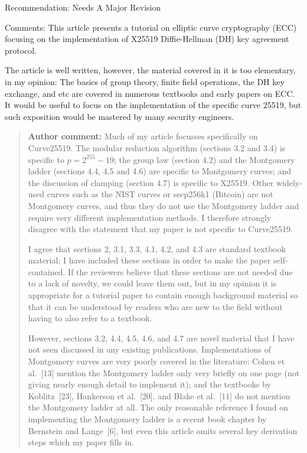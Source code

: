 \documentclass[10pt]{article}
\newcommand{\authorcomment}[1]{\begin{quote}\textbf{Author comment:} #1\end{quote}}
\begin{document}
\begin{spverbatim}
Recommendation: Needs A Major Revision

Comments:
This article presents a tutorial on elliptic curve cryptography (ECC) focusing on the implementation of X25519 Diffie-Hellman (DH) key agreement protocol. 

The article is well written, however, the material covered in it is too elementary, in my opinion: The basics of group theory, finite field operations, the DH key exchange, and etc are covered in numerous textbooks and early papers on ECC.  It would be useful to focus on the implementation of the specific curve 25519, but such exposition would be mastered by many security engineers. 
\end{spverbatim}
\authorcomment{Much of my article focusses specifically on Curve25519.
The modular reduction algorithm (sections 3.2 and 3.4) is specific to $p = 2^{255} - 19$; the group law (section 4.2) and the Montgomery ladder (sections 4.4, 4.5 and 4.6) are specific to Montgomery curves; and the discussion of clamping (section 4.7) is specific to X25519.
Other widely-used curves such as the NIST curves or secp256k1 (Bitcoin) are not Montgomery curves, and thus they do not use the Montgomery ladder and require very different implementation methods.
I therefore strongly disagree with the statement that my paper is not specific to Curve25519.

I agree that sections 2, 3.1, 3.3, 4.1, 4.2, and 4.3 are standard textbook material; I have included these sections in order to make the paper self-contained.
If the reviewers believe that these sections are not needed due to a lack of novelty, we could leave them out, but in my opinion it is appropriate for a tutorial paper to contain enough background material so that it can be understood by readers who are new to the field without having to also refer to a textbook.

However, sections 3.2, 4.4, 4.5, 4.6, and 4.7 are novel material that I have not seen discussed in any existing publications.
Implementations of Montgomery curves are very poorly covered in the literature: Cohen et al.~[13] mention the Montgomery ladder only very briefly on one page (not giving nearly enough detail to implement it); and the textbooks by Koblitz~[23], Hankerson et al.~[20], and Blake et al.~[11] do not mention the Montgomery ladder at all.
The only reasonable reference I found on implementing the Montgomery ladder is a recent book chapter by Bernstein and Lange~[6], but even this article omits several key derivation steps which my paper fills in.}
\end{document}
